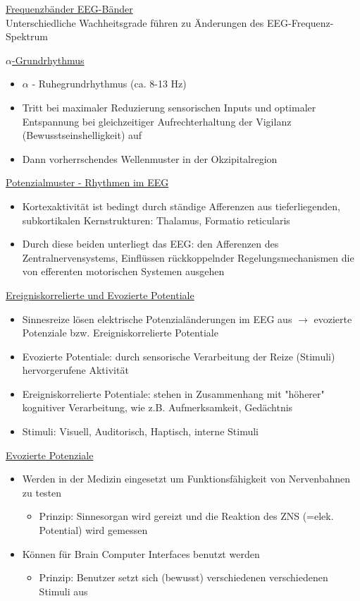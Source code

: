 \documentclass[a4paper,10pt,oneside]{article}
\begin{document}
\underline{Frequenzbänder EEG-Bänder} \\
Unterschiedliche Wachheitsgrade führen zu Änderungen des EEG-Frequenz-Spektrum
 
\underline{$\alpha$-Grundrhythmus} \\
	\begin{itemize}
		\item $\alpha$ - Ruhegrundrhythmus (ca. 8-13 Hz)
		\item Tritt bei maximaler Reduzierung sensorischen Inputs und optimaler Entspannung bei gleichzeitiger Aufrechterhaltung der Vigilanz (Bewusstseinshelligkeit) auf
		\item Dann vorherrschendes Wellenmuster in der Okzipitalregion
	\end{itemize}
	
\underline{Potenzialmuster - Rhythmen im EEG} \\
	\begin{itemize}
		\item Kortexaktivität ist bedingt durch ständige Afferenzen aus tieferliegenden, subkortikalen Kernstrukturen: Thalamus, Formatio reticularis 
		\item Durch diese beiden unterliegt das EEG: den Afferenzen des Zentralnervensystems, Einflüssen rückkoppelnder Regelungsmechanismen die von efferenten motorischen Systemen ausgehen
	\end{itemize}
	
\underline{Ereigniskorrelierte und Evozierte Potentiale} \\
 	\begin{itemize}
 		\item Sinnesreize lösen elektrische Potenzialänderungen im EEG aus $\rightarrow$ evozierte Potenziale bzw. Ereigniskorrelierte Potentiale 
 		\item Evozierte Potentiale: durch sensorische Verarbeitung der Reize (Stimuli) hervorgerufene Aktivität
 		\item Ereigniskorrelierte Potentiale: stehen in Zusammenhang mit "höherer" kognitiver Verarbeitung, wie z.B. Aufmerksamkeit, Gedächtnis
 		\item Stimuli: Visuell, Auditorisch, Haptisch, interne Stimuli
 	\end{itemize}

\underline{Evozierte Potenziale} \\
	\begin{itemize}
		\item Werden in der Medizin eingesetzt um Funktionsfähigkeit von Nervenbahnen zu testen
			\begin{itemize}
				\item Prinzip: Sinnesorgan wird gereizt und die Reaktion des ZNS (=elek. Potential) wird gemessen
			\end{itemize}
		\item Können für Brain Computer Interfaces benutzt werden
			\begin{itemize}
				\item Prinzip: Benutzer setzt sich (bewusst) verschiedenen verschiedenen Stimuli aus
			\end{itemize}
	\end{itemize}
	
\end{document}
